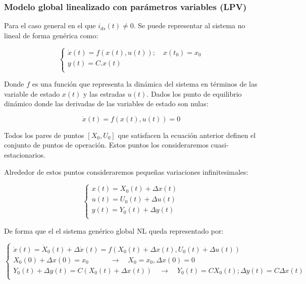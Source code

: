 \documentclass{article}
\begin{document}

\subsubsection{Modelo global linealizado con parámetros variables (LPV)}

Para el caso general en el que ${i}_{ds}(t) \neq 0$. Se puede representar al sistema no lineal de forma genérica
como: 

\begin{equation}
    \begin{cases}
        \dot{x}(t) = f(x(t),u(t));  \quad   x(t_{0}) = x_{0}\\
        y(t) = C.x(t)\\
    \end{cases}
\end{equation}

Donde $f$ es una función que representa la dinámica del sistema en términos de las variable 
de estado $x(t)$ y las estradas $u(t)$.  
Dados los punto de equilibrio dinámico donde las derivadas de las variables de estado son nulas:

\begin{equation}
    \dot{x}(t) = f(x(t),u(t)) = 0
\end{equation}

Todos los pares de puntos $[X_0,U_0]$ que satisfacen la ecuación anterior definen el conjunto de
puntos de operación. Estos puntos los consideraremos cuasi-estacionarios. 

Alrededor de estos puntos consideraremos pequeñas variaciones infinitesimales:

\begin{equation}
    \begin{cases}
        x(t) = X_{0}(t) + \Delta x(t)\\
        u(t) = U_{0}(t) + \Delta u(t)\\
        y(t) = Y_{0}(t) + \Delta y(t)\\
    \end{cases}
\end{equation}

De forma que el el sistema genérico global NL queda representado por:

\begin{equation}
    \begin{cases}
        \dot{x}(t) = \dot{X}_{0}(t) + \Delta\dot{x}(t) = f(X_{0}(t) + \Delta x(t), U_{0}(t) + \Delta u(t))\\
        X_{0}(0) + \Delta x(0) = x_{0} \quad\quad\quad \rightarrow \quad X_{0} = x_{0}, \Delta x(0) = 0 \\
        Y_{0}(t) + \Delta y(t) = C(X_{0}(t) + \Delta x(t)) \quad\rightarrow\quad Y_{0}(t) = C X_{0}(t); \Delta y(t) = C \Delta x(t)\\
    \end{cases}
\end{equation}
\end{document}
